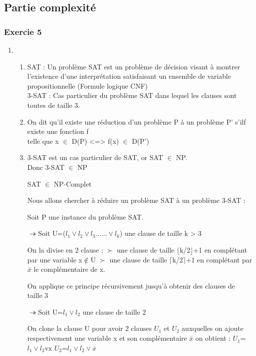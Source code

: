 \documentclass[]{article}
\begin{document}
\subsection{Partie complexité}

\subsubsection{Exercie 5}

\begin{enumerate}
\item 
  \begin{enumerate}
  \item
    SAT : Un  problème SAT est un problème de décision visant à montrer l'existence d'une interprétation satisfaisant un ensemble de variable propositionnelle (Formule logique CNF)\\
    3-SAT : Cas particulier du problème SAT dans lequel les clauses sont toutes de taille 3.\\

  \item
    On dit qu'il existe une réduction d'un problème P à un problème P' s'ilf existe une fonction f\\
    telle que x $\in$ D(P) <=> f(x) $\in$ D(P')\\

  \item
    3-SAT est un cas particulier de SAT, or SAT $\in$ NP.\\
    Donc 3-SAT $\in$ NP

    SAT $\in$ NP-Complet

    Nous allons chercher à réduire un problème SAT à un problème 3-SAT : 

    Soit P une instance du problème SAT.
    
    $\twoheadrightarrow$Soit U=($l_1 \vee l_2 \vee l_3......\vee l_k$) une clause de taille k > 3

    On la divise en 2 clause :
    $\succ$ une clause de taille $\lfloor$k/2$\rfloor$+1 en complétant par une variable x$\notin$U 
    $\succ$ une clause de taille $\lceil$k/2$\rceil$+1 en complétant par $\overline x$ le complémentaire de x.

    On applique ce principe récursivement jusqu'à obtenir des clauses de taille 3

    $\twoheadrightarrow$Soit U={$l_1 \vee l_2$} une clause de taille 2
    
    On clone la clause U pour avoir 2 clauses $U_1$ et $U_2$ auxquelles on ajoute respectivement une variable x et son complémentaire $\overline x$
    on obtient :  $U_1$={$l_1 \vee l_2$vx}
    $U_2$={$l_1 \vee l_2 \vee \overline x$}


\end{enumerate}
\end{enumerate}
\end{document}
